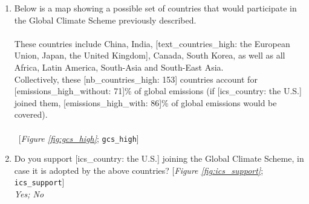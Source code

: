 \begin{enumerate}[resume]
\item  \label{q:gcs_high} Below is a map showing a possible set of countries that would participate in the Global Climate Scheme previously described.\\
~\\
These countries include China, India, [text\_countries\_high: the European Union, Japan, the United Kingdom], Canada, South Korea, as well as all Africa, Latin America, South-Asia and South-East Asia.~\\
Collectively, these [nb\_countries\_high: 153] countries account for [emissions\_high\_without: 71]\% of global emissions (if [ics\_country: the U.S.] joined them, [emissions\_high\_with: 86]\% of global emissions would be covered).\\
~\\ 
~[\textit{Figure \ref{fig:gcs_high}}; 
\verb|gcs_high|]


\item  \label{q:ics_support} Do you support [ics\_country: the U.S.] joining the Global Climate Scheme, in case it is adopted by the above countries? [\textit{Figure \ref{fig:ics_support}}; 
\verb|ics_support|]
  \\ \textit{Yes; No}

\end{enumerate} 

